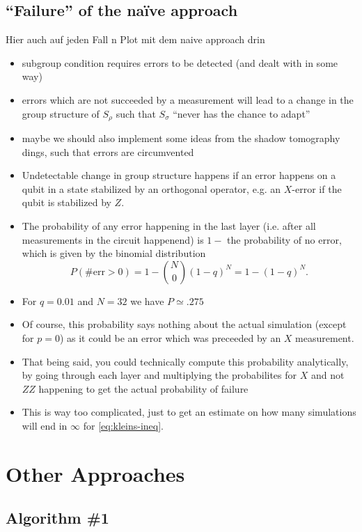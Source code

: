 \clearpage
\subsection{\enquote{Failure} of the na\"ive approach}
Hier auch auf jeden Fall n Plot mit dem naive approach drin
\begin{itemize}
  \item subgroup condition requires errors to be detected (and dealt with in
    some way)
  \item errors which are not succeeded by a measurement will lead to a change
    in the group structure of $S_\rho$ such that $S_\sigma$ \enquote{never has
    the chance to adapt}
  \item maybe we should also implement some ideas from the shadow tomography
    dings, such that errors are circumvented
  \item Undetectable change in group structure happens if an error happens on a
    qubit in a state stabilized by an orthogonal operator, e.g. an $X$-error if
    the qubit is stabilized by $Z$.
  \item The probability of any error happening in the last layer (i.e. after
    all measurements in the circuit happenend) is $1-$ the probability of no
    error, which is given by the binomial distribution
    \[ P(\#\mathrm{err}>0) = 1-\binom{N}{0} (1-q)^N=1-(1-q)^N. \]
  \item For $q=\num{0.01}$ and $N=32$ we have $P\simeq .275$
  \item Of course, this probability says nothing about the actual simulation
    (except for $p=0$) as it could be an error which was preceeded by an $X$
    measurement.
  \item That being said, you could technically compute this probability
    analytically, by going through each layer and multiplying the probabilites
    for \(X\) and not $ZZ$ happening to get the actual probability of failure
   \item This is way too complicated, just to get an estimate on how many
     simulations will end in $\infty$ for \cref{eq:kleins-ineq}. 
\end{itemize}
\clearpage
\section{Other Approaches}
\subsection{Algorithm \#1}
